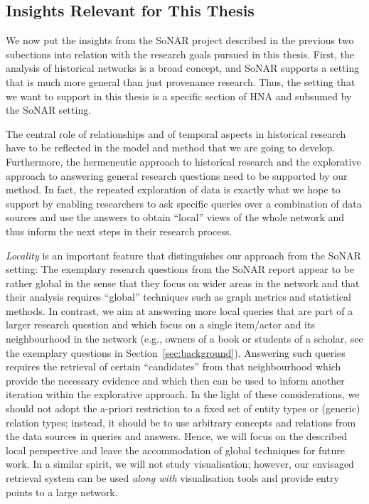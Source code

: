 \subsection{Insights Relevant for This Thesis}
\label{subsec:insights_from_SoNAR}

We now put the insights from the \gls{SoNAR} project described in the previous two subections
into relation with the research goals pursued in this thesis.
First, the analysis of historical networks is a broad concept, and \gls{SoNAR} supports a setting
that is much more general than just provenance research.
Thus, the setting that we want to support in this thesis is a specific section of \gls{HNA} and subsumed 
by the \gls{SoNAR} setting.

The central role of relationships and of temporal aspects in historical research
have to be reflected in the model and method that we are going to develop.
Furthermore, the hermeneutic approach to historical research
and the explorative approach to answering general research questions 
need to be supported by our method. In fact, the repeated exploration of data
is exactly what we hope to support by enabling researchers to ask specific
queries over a combination of data sources and use the answers to obtain
\enquote{local} views of the whole network and thus inform the next steps in their research process.

\emph{Locality} is an important feature that distinguishes our approach from the \gls{SoNAR} setting:
The exemplary research questions from the \gls{SoNAR} report appear to be rather global
in the sense that they focus on wider areas in the network and that their analysis requires
\enquote{global} techniques such as graph metrics and statistical methods.
In contrast, we aim at answering more local queries
that are part of a larger research question and which 
focus on a single item/actor and its neighbourhood in the network
(e.g., owners of a book or students of a scholar, see the exemplary questions
in Section~\ref{sec:background}). Answering such queries
requires the retrieval of certain \enquote{candidates} from that neighbourhood
which provide the necessary evidence and which then can be used
to inform another iteration within the explorative approach.
In the light of these considerations, 
we should not adopt the a-priori restriction
to a fixed set of entity types or (generic) relation types;
instead, it should be to use arbitrary concepts and relations
from the data sources in queries and answers.
Hence, we will focus on the described local perspective
and leave the accommodation of global techniques for future work.
In a similar spirit, we will not study visualisation;
however, our envisaged retrieval system can be used \emph{along with} visualisation tools
and provide entry points to a large network.

